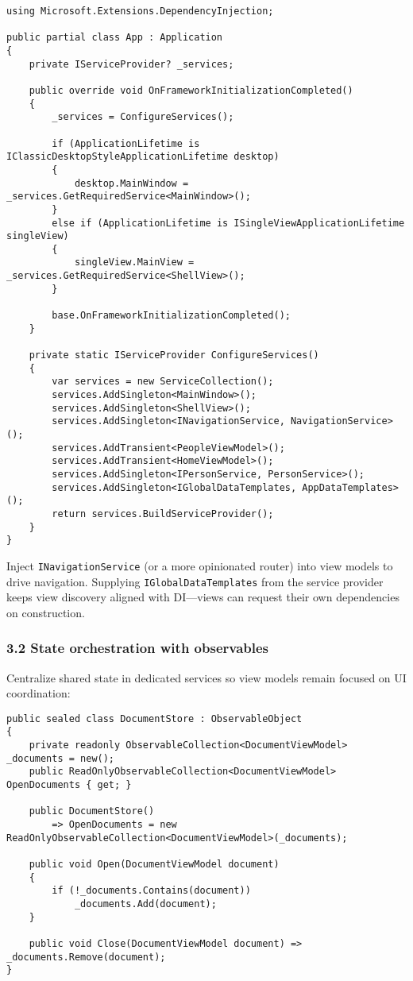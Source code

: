 \begin{lstlisting}
using Microsoft.Extensions.DependencyInjection;

public partial class App : Application
{
    private IServiceProvider? _services;

    public override void OnFrameworkInitializationCompleted()
    {
        _services = ConfigureServices();

        if (ApplicationLifetime is IClassicDesktopStyleApplicationLifetime desktop)
        {
            desktop.MainWindow = _services.GetRequiredService<MainWindow>();
        }
        else if (ApplicationLifetime is ISingleViewApplicationLifetime singleView)
        {
            singleView.MainView = _services.GetRequiredService<ShellView>();
        }

        base.OnFrameworkInitializationCompleted();
    }

    private static IServiceProvider ConfigureServices()
    {
        var services = new ServiceCollection();
        services.AddSingleton<MainWindow>();
        services.AddSingleton<ShellView>();
        services.AddSingleton<INavigationService, NavigationService>();
        services.AddTransient<PeopleViewModel>();
        services.AddTransient<HomeViewModel>();
        services.AddSingleton<IPersonService, PersonService>();
        services.AddSingleton<IGlobalDataTemplates, AppDataTemplates>();
        return services.BuildServiceProvider();
    }
}
\end{lstlisting}

Inject \passthrough{\lstinline!INavigationService!} (or a more
opinionated router) into view models to drive navigation. Supplying
\passthrough{\lstinline!IGlobalDataTemplates!} from the service provider
keeps view discovery aligned with DI---views can request their own
dependencies on construction.

\subsubsection{3.2 State orchestration with
observables}\label{state-orchestration-with-observables}

Centralize shared state in dedicated services so view models remain
focused on UI coordination:

\begin{lstlisting}
public sealed class DocumentStore : ObservableObject
{
    private readonly ObservableCollection<DocumentViewModel> _documents = new();
    public ReadOnlyObservableCollection<DocumentViewModel> OpenDocuments { get; }

    public DocumentStore()
        => OpenDocuments = new ReadOnlyObservableCollection<DocumentViewModel>(_documents);

    public void Open(DocumentViewModel document)
    {
        if (!_documents.Contains(document))
            _documents.Add(document);
    }

    public void Close(DocumentViewModel document) => _documents.Remove(document);
}
\end{lstlisting}

